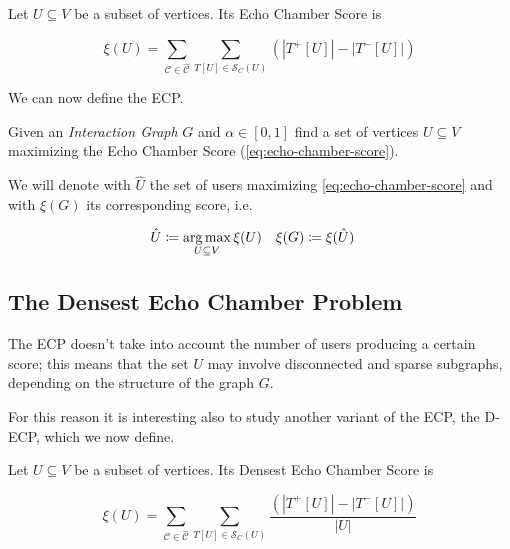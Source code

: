 \begin{definition}
	Let $U \subseteq V$ be a subset of vertices. Its Echo Chamber Score is

	\begin{equation}
		\label{eq:echo-chamber-score}
		\xi(U) = \sum^{}_{\mathcal{C} \in \mathcal{\hat{C}}} \sum^{}_{T[U] \in
		\mathcal{S} _{C} (U)} (|T^{+} [U]| - |T ^{-} [U]|)
	\end{equation}
\end{definition}

We can now define the \acrfull{ECP}.

\begin{problem}
Given an \emph{Interaction Graph} $G$ and $\alpha \in [0, 1]$ find a set of vertices $U \subseteq
	V$ maximizing the Echo Chamber Score (\autoref{eq:echo-chamber-score}).
\end{problem}

We will denote with $\hat{U}$ the set of users maximizing
\autoref{eq:echo-chamber-score} and with $\xi(G)$ its corresponding score, i.e.

\begin{align*}
	\hat{U} & \coloneqq \operatorname*{arg\,max}_{U \subseteq V} \xi(U) & \xi(G) & \coloneqq
	\xi(\hat{U})
\end{align*}

\subsection{The Densest Echo Chamber Problem}%
\label{sub:the_densest_echo_chamber_problem}

The \acrshort{ECP} doesn't take into account the number of users producing a
certain score; this means that the set $U$ may involve disconnected and sparse
subgraphs, depending on the structure of the graph $G$.

For this reason it is interesting also to study another variant of the
\acrshort{ECP}, the \acrlong{D-ECP}, which we now define.

\begin{definition}
	Let $U \subseteq V$ be a subset of vertices. Its Densest Echo Chamber Score is

	\begin{equation}
		\label{eq:densest-echo-chamber-score}
		\xi(U) = \sum^{}_{\mathcal{C} \in \mathcal{\hat{C}}} \sum^{}_{T[U] \in
		\mathcal{S} _{C} (U)} \frac{(|T^{+} [U]| - |T ^{-} [U]|)}{|U|}
	\end{equation}
\end{definition}

